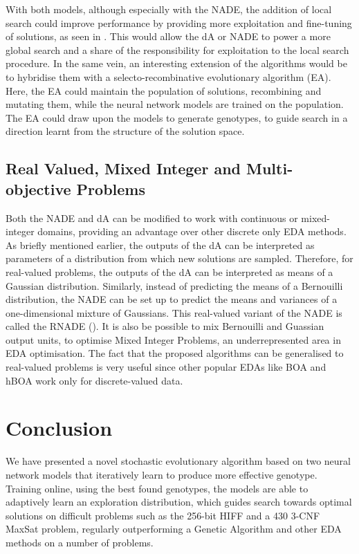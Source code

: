 \documentclass[twoside]{article}
\begin{document}
With both models, although especially with the NADE, the addition of local search could improve performance by providing more exploitation and fine-tuning of solutions, as seen in \citep{pelikan2003hierarchical}. This would allow the dA or NADE to power a more global search and a share of the responsibility for exploitation to the local search procedure. In the same vein, an interesting extension of the algorithms would be to hybridise them with a selecto-recombinative evolutionary algorithm (EA). Here, the EA could maintain the population of solutions, recombining and mutating them, while the neural network models are trained on the population. The EA could draw upon the models to generate genotypes, to guide search in a direction learnt from the structure of the solution space. 
\subsection{Real Valued, Mixed Integer and Multi-objective Problems}
Both the NADE and dA can be modified to work with continuous or mixed-integer domains, providing an advantage over other discrete only EDA methods. As briefly mentioned earlier, the outputs of the dA can be interpreted as parameters of a distribution from which new solutions are sampled. Therefore, for real-valued problems, the outputs of the dA can be interpreted as means of a Gaussian distribution. Similarly, instead of predicting the means of a Bernouilli distribution, the NADE can be set up to predict the means and variances of a one-dimensional mixture of Gaussians. This real-valued variant of the NADE is called the RNADE (\cite{uria2013rnade}). It is also be possible to mix Bernouilli and Guassian output units, to optimise Mixed Integer Problems, an underrepresented area in EDA optimisation. The fact that the proposed algorithms can be generalised to real-valued problems is very useful since other popular EDAs like BOA and hBOA work only for discrete-valued data.

\section{Conclusion}
We have presented a novel stochastic evolutionary algorithm based on two neural network models that iteratively learn to produce more effective genotype. Training online, using the best found genotypes, the models are able to adaptively learn an exploration distribution, which guides search towards optimal solutions on difficult problems such as the 256-bit HIFF and a 430 3-CNF MaxSat problem, regularly outperforming a Genetic Algorithm and other EDA methods on a number of problems. 
\small



\end{document}
